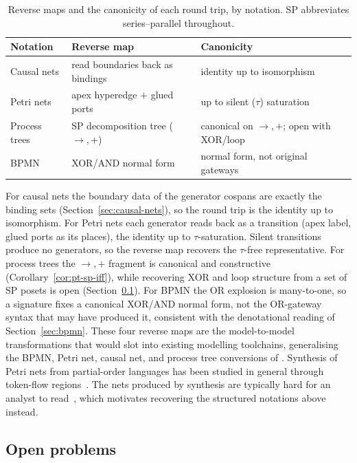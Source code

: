 \begin{table}[t]
  \centering
  \caption{Reverse maps and the canonicity of each round trip, by notation. SP abbreviates series--parallel throughout.}
  \label{tab:faithfulness}
  \small\begin{tabularx}{\linewidth}{@{}llX@{}}
    \hline
    Notation & Reverse map & Canonicity \\
    \hline
    Causal nets   & read boundaries back as bindings & identity up to isomorphism \\
    Petri nets    & apex hyperedge $+$ glued ports    & up to silent ($\tau$) saturation \\
    Process trees & SP decomposition tree ($\to,+$)   & canonical on $\to,+$; open with XOR/loop \\
    BPMN          & XOR/AND normal form               & normal form, not original gateways \\
    \hline
  \end{tabularx}
\end{table}

For causal nets the boundary data of the generator cospans are exactly the binding sets
(Section~\ref{sec:causal-nets}), so the round trip is the identity up to isomorphism. For Petri nets
each generator reads back as a transition (apex label, glued ports as its places), the identity up
to $\tau$-saturation. Silent transitions produce no generators, so the reverse map recovers the
$\tau$-free representative. For process trees the $\to,+$ fragment is canonical and constructive
(Corollary~\ref{cor:pt-sp-iff}), while recovering XOR and loop structure from a set of SP posets is
open (Section~\ref{subsec:open-problems}). For BPMN the OR explosion is many-to-one, so a signature
fixes a canonical XOR/AND normal form, not the OR-gateway syntax that may have produced it,
consistent with the denotational reading of Section~\ref{sec:bpmn}.
These four reverse maps are the model-to-model transformations that would slot into
existing modelling toolchains, generalising the BPMN, Petri net, causal net, and process tree
conversions of \citet{kalenkovaProcessMiningUsing2017}.
Synthesis of Petri nets from partial-order languages has been studied in general through
token-flow regions~\cite{bergenthumSynthesisPetriNets2008}. The nets produced by synthesis are
typically hard for an analyst to read~\cite{leemansPartialorderbasedProcessMining2023}, which
motivates recovering the structured notations above instead.

\subsection{Open problems}\label{subsec:open-problems}

